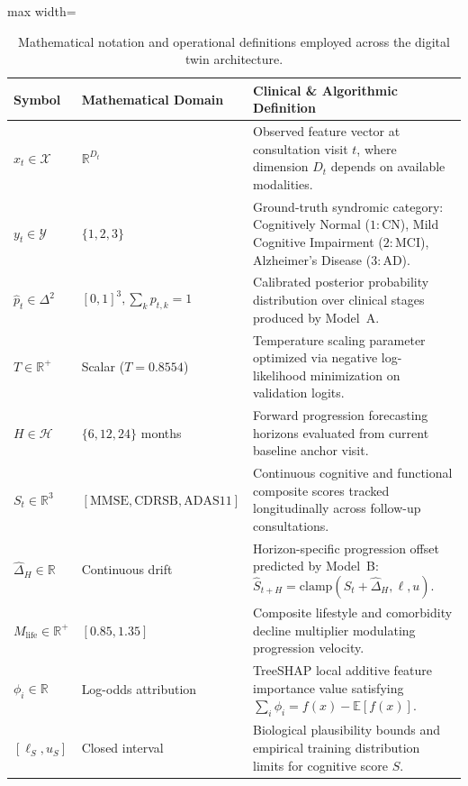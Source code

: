 \documentclass[11pt,a4paper]{article}
\begin{document}
\begin{table}[t]
\centering
\caption{Mathematical notation and operational definitions employed across the digital twin architecture.}
\label{tab:notation}
\small
\begin{adjustbox}{max width=\linewidth}
\begin{tabular}{llp{7.5cm}}
\toprule
\textbf{Symbol} & \textbf{Mathematical Domain} & \textbf{Clinical \& Algorithmic Definition} \\
\midrule
$x_t \in \mathcal{X}$ & $\mathbb{R}^{D_t}$ & Observed feature vector at consultation visit $t$, where dimension $D_t$ depends on available modalities. \\
$y_t \in \mathcal{Y}$ & $\{1, 2, 3\}$ & Ground-truth syndromic category: Cognitively Normal ($1: \text{CN}$), Mild Cognitive Impairment ($2: \text{MCI}$), Alzheimer's Disease ($3: \text{AD}$). \\
$\hat{p}_t \in \Delta^2$ & $[0, 1]^3, \sum_k p_{t,k} = 1$ & Calibrated posterior probability distribution over clinical stages produced by Model~A. \\
$T \in \mathbb{R}^+$ & Scalar ($T = 0.8554$) & Temperature scaling parameter optimized via negative log-likelihood minimization on validation logits. \\
$H \in \mathcal{H}$ & $\{6, 12, 24\}$ months & Forward progression forecasting horizons evaluated from current baseline anchor visit. \\
$S_t \in \mathbb{R}^3$ & $[\text{MMSE}, \text{CDRSB}, \text{ADAS11}]$ & Continuous cognitive and functional composite scores tracked longitudinally across follow-up consultations. \\
$\hat{\Delta}_H \in \mathbb{R}$ & Continuous drift & Horizon-specific progression offset predicted by Model~B: $\hat{S}_{t+H} = \text{clamp}(S_t + \hat{\Delta}_H, \ell, u)$. \\
$M_{\text{life}} \in \mathbb{R}^+$ & $[0.85, 1.35]$ & Composite lifestyle and comorbidity decline multiplier modulating progression velocity. \\
$\phi_i \in \mathbb{R}$ & Log-odds attribution & TreeSHAP local additive feature importance value satisfying $\sum_i \phi_i = f(x) - \mathbb{E}[f(x)]$. \\
$[\ell_S, u_S]$ & Closed interval & Biological plausibility bounds and empirical training distribution limits for cognitive score $S$. \\
\bottomrule
\end{tabular}
\end{adjustbox}
\end{table}
\end{document}
